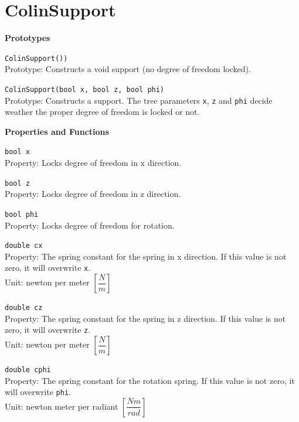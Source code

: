 \section{ColinSupport}
\label{sec:jsColinSupport}
\begin{trivlist}
\item[]\textbf{Prototypes}
	\begin{trivlist}
		\leftskip=1cm
		\item[] \texttt{ColinSupport())}\\Prototype: Constructs a void support (no degree of freedom locked).
		\item[] \texttt{ColinSupport(bool x, bool z, bool phi)}\\Prototype: Constructs a support. The tree parameters \texttt{x}, \texttt{z} and \texttt{phi} decide weather the proper degree of freedom is locked or not.
	\end{trivlist}
\item[]\textbf{Properties and Functions}
	\begin{trivlist}
		\leftskip=1cm
		\item[] \texttt{bool x}\\Property: Locks degree of freedom in x direction.
		\item[] \texttt{bool z}\\Property: Locks degree of freedom in z direction.
		\item[] \texttt{bool phi}\\Property: Locks degree of freedom for rotation.
		\item[] \texttt{double cx}\\Property: The spring constant for the spring in x direction. If this value is not zero, it will overwrite \texttt{x}.\\Unit: newton per meter $\left[\dfrac{N}{m}\right]$
		\item[] \texttt{double cz}\\Property: The spring constant for the spring in z direction. If this value is not zero, it will overwrite \texttt{z}.\\Unit: newton per meter $\left[\dfrac{N}{m}\right]$
		\item[] \texttt{double cphi}\\Property: The spring constant for the rotation spring. If this value is not zero, it will overwrite \texttt{phi}.\\Unit: newton meter per radiant $\left[\dfrac{Nm}{rad}\right]$
	\end{trivlist}
\end{trivlist}

